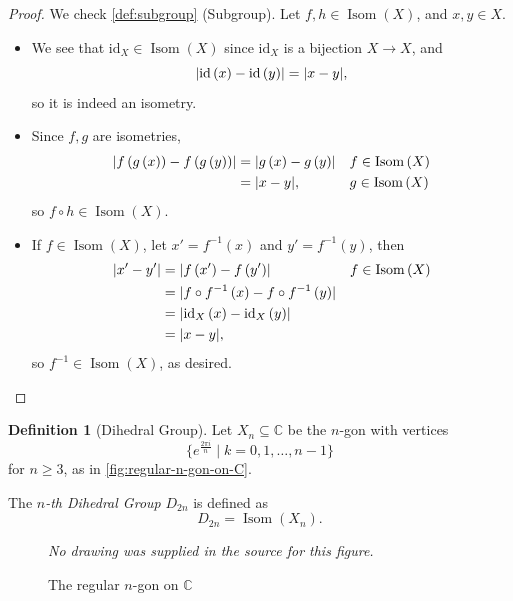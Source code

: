 \documentclass{article}
\theoremstyle{definition}
\newtheorem{definition}[theorem]{Definition}
\theoremstyle{remark}
\DeclarePairedDelimiter{\abs}{\lvert}{\rvert}
\newcommand{\pqty}[1]{\left(#1\right)}
\newcommand{\set}[2]{\{#1\mid #2\}}
\newcommand{\inverse}{^{-1}}
\newcommand{\identity}{\mathrm{id}}
\newcommand{\CC}{\mathbb{C}}
\newcommand{\Isom}{\operatorname{Isom}}
\begin{document}
\begin{proof}
    We check \autoref{def:subgroup} (Subgroup). Let \(f, h \in \Isom\pqty{X}\), and \(x, y \in X\).

    \begin{itemize}
        \item We see that \(\identity_{X} \in \Isom\pqty{X}\) since \(\identity_{X}\) is a bijection \(X \to X\), and
        \[
            \abs{\identity\pqty{x} - \identity\pqty{y}} = \abs{x - y},
        \]
        so it is indeed an isometry.

        \item Since \(f, g\) are isometries,
        \begin{align*}
            \abs{f\pqty{g \pqty{x}} - f\pqty{g \pqty{y}}} &= \abs{g\pqty{x} - g\pqty{y}} && f \in \Isom\pqty{X} \\
            &= \abs{x - y}, && g \in \Isom\pqty{X}
        \end{align*}
        so \(f \circ h \in \Isom\pqty{X}\).

        \item If \(f \in \Isom\pqty{X}\), let \(x' = f\inverse\pqty{x}\) and \(y' = f\inverse\pqty{y}\), then
        \begin{align*}
            \abs{x' - y'} &= \abs{f\pqty{x'} - f\pqty{y'}} && f \in \Isom\pqty{X} \\
            &= \abs{f \circ f\inverse \pqty{x} - f \circ f\inverse \pqty{y}} \\
            &= \abs{\identity_{X} \pqty{x} - \identity_{X} \pqty{y}} \\
            &= \abs{x - y},
        \end{align*}
        so \(f \inverse \in \Isom\pqty{X}\), as desired.
    \end{itemize}
\end{proof}

\begin{definition}[Dihedral Group]
    Let \(X_n \subseteq \CC\) be the \(n\)-gon with vertices
    \[
        \set{e^{\frac{2 \pi i}{n}}}{k = 0, 1, \ldots, n - 1}
    \]
    for \(n \geq 3\), as in \autoref{fig:regular-n-gon-on-C}.

    The \emph{\(n\)-th Dihedral Group} \(D_{2n}\) is defined as
    \[
        D_{2n} = \Isom\pqty{X_n}.
    \]
\end{definition}

\begin{figure}[ht!]
    \centering
    \emph{No drawing was supplied in the source for this figure.}\par
\caption{The regular \(n\)-gon on \(\CC\)}
    \label{fig:regular-n-gon-on-C}
\end{figure}
\end{document}
